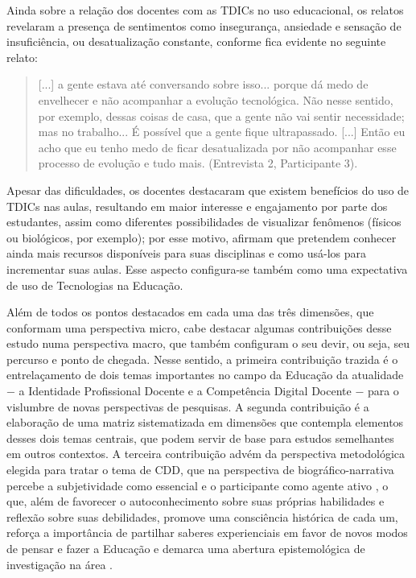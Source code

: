 \documentclass[portuguese]{textolivre}
\begin{document}
Ainda sobre a relação dos docentes com as TDICs no uso educacional, os relatos revelaram a presença de sentimentos como insegurança, ansiedade e sensação de insuficiência, ou desatualização constante, conforme fica evidente no seguinte relato:

\begin{quote}
    [...] a gente estava até conversando sobre isso... porque dá medo de envelhecer e não acompanhar a evolução tecnológica. Não nesse sentido, por exemplo, dessas coisas de casa, que a gente não vai sentir necessidade; mas no trabalho... É possível que a gente fique ultrapassado. [...] Então eu acho que eu tenho medo de ficar desatualizada por não acompanhar esse processo de evolução e tudo mais. (Entrevista 2, Participante 3).
\end{quote}

Apesar das dificuldades, os docentes destacaram que existem benefícios do uso de TDICs nas aulas, resultando em maior interesse e engajamento por parte dos estudantes, assim como diferentes possibilidades de visualizar fenômenos (físicos ou biológicos, por exemplo); por esse motivo, afirmam que pretendem conhecer ainda mais recursos disponíveis para suas disciplinas e como usá-los para incrementar suas aulas. Esse aspecto configura-se também como uma expectativa de uso de Tecnologias na Educação.

Além de todos os pontos destacados em cada uma das três dimensões, que conformam uma perspectiva micro, cabe destacar algumas contribuições desse estudo numa perspectiva macro, que também configuram o seu devir, ou seja, seu percurso e ponto de chegada. Nesse sentido, a primeira contribuição trazida é o entrelaçamento de dois temas importantes no campo da Educação da atualidade − a Identidade Profissional Docente e a Competência Digital Docente − para o vislumbre de novas perspectivas de pesquisas. A segunda contribuição é a elaboração de uma matriz sistematizada em dimensões que contempla elementos desses dois temas centrais, que podem servir de base para estudos semelhantes em outros contextos. A terceira contribuição advém da perspectiva metodológica elegida para tratar o tema de CDD, que na perspectiva de biográfico-narrativa percebe a subjetividade como essencial e o participante como agente ativo \cite{miranda2019}, o que, além de favorecer o autoconhecimento sobre suas próprias habilidades e reflexão sobre suas debilidades, promove uma consciência histórica de cada um, reforça a importância de partilhar saberes experienciais em favor de novos modos de pensar e fazer a Educação e demarca uma abertura epistemológica de investigação na área \cite{souzaclementino2020}.
\end{document}
